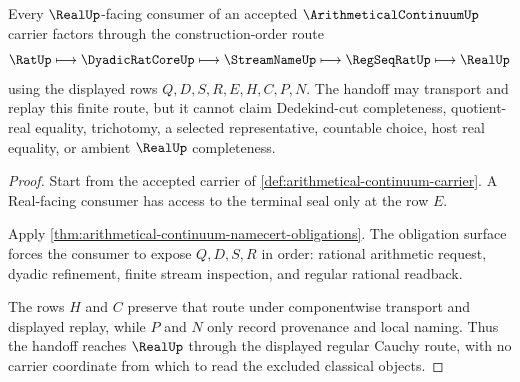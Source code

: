 \begin{theorem}
\label{thm:arithmetical-continuum-regular-cauchy-handoff}
Every $\RealUp$-facing consumer of an accepted $\ArithmeticalContinuumUp$ carrier factors through the construction-order route
$$
\RatUp \longmapsto \DyadicRatCoreUp \longmapsto \StreamNameUp \longmapsto \RegSeqRatUp \longmapsto \RealUp
$$
using the displayed rows $Q,D,S,R,E,H,C,P,N$. The handoff may transport and replay this finite route, but it cannot claim Dedekind-cut completeness, quotient-real equality, trichotomy, a selected representative, countable choice, host real equality, or ambient $\RealUp$ completeness.
\end{theorem}
\begin{proof}
Start from the accepted carrier of \autoref{def:arithmetical-continuum-carrier}. A Real-facing consumer has access to the terminal seal only at the row $E$.

Apply \autoref{thm:arithmetical-continuum-namecert-obligations}. The obligation surface forces the consumer to expose $Q,D,S,R$ in order: rational arithmetic request, dyadic refinement, finite stream inspection, and regular rational readback.

The rows $H$ and $C$ preserve that route under componentwise transport and displayed replay, while $P$ and $N$ only record provenance and local naming. Thus the handoff reaches $\RealUp$ through the displayed regular Cauchy route, with no carrier coordinate from which to read the excluded classical objects.
\end{proof}




